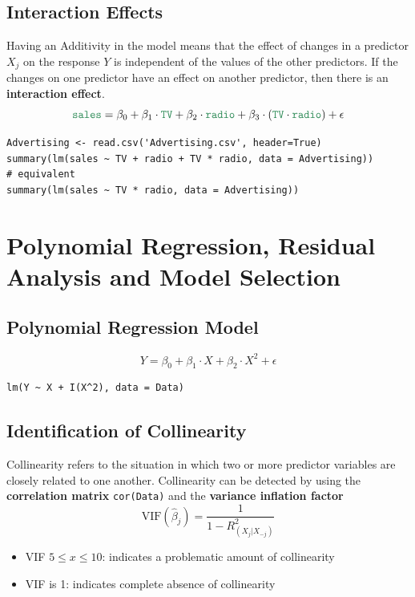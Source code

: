 \documentclass[11pt]{article}
\theoremstyle{definition}
\newcommand*\predvar[1]{{\color{SeaGreen4} \texttt{#1}}}
\begin{document}
\subsection{Interaction Effects}
Having an Additivity in the model means that the effect of changes in a predictor $X_j$ on the response $Y$ is independent of the values of the other predictors. If the changes on one predictor have an effect on another predictor, then there is an \textbf{interaction effect}.
\begin{equation*}
	\predvar{sales} = \beta_0 + \beta_1 \cdot \predvar{TV} + \beta_2\cdot\predvar{radio} + \beta_3\cdot(\predvar{TV}\cdot\predvar{radio}) + \epsilon
\end{equation*}
\begin{verbatim}
Advertising <- read.csv('Advertising.csv', header=True)
summary(lm(sales ~ TV + radio + TV * radio, data = Advertising))
# equivalent
summary(lm(sales ~ TV * radio, data = Advertising))
\end{verbatim}

\section{Polynomial Regression, Residual Analysis and Model Selection}

\subsection{Polynomial Regression Model}

\begin{equation*}
	Y = \beta_0 + \beta_1\cdot X + \beta_2\cdot X^2 + \epsilon
\end{equation*}

\begin{verbatim}
lm(Y ~ X + I(X^2), data = Data)
\end{verbatim}

\subsection{Identification of Collinearity}
Collinearity refers to the situation in which two or more predictor variables are closely related to one another. Collinearity can be detected by using the \textbf{correlation matrix} \texttt{cor(Data)} and the \textbf{variance inflation factor}
\begin{equation*}
	\text{VIF}(\hat{\beta}_j) = \frac{1}{1- R_{(X_j|X_{-j})}^2}
\end{equation*}
\begin{itemize}
	\item VIF $5\leq x\leq 10$: indicates a problematic amount of collinearity
	\item VIF is 1: indicates complete absence of collinearity
\end{itemize}
\end{document}
